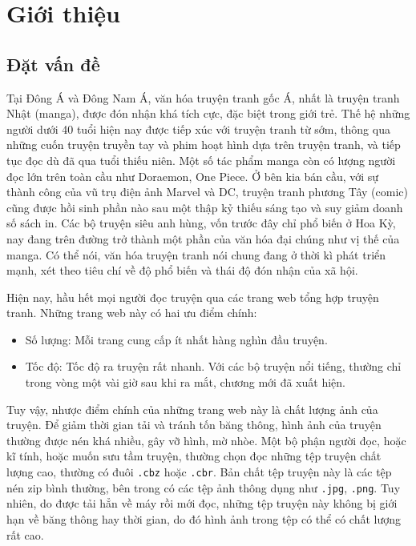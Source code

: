 \documentclass[../../thesis]{subfiles}
\begin{document}
\chapter{Giới thiệu}


\section{Đặt vấn đề}

Tại Đông Á và Đông Nam Á, văn hóa truyện tranh gốc Á, nhất là truyện tranh Nhật
(manga), được đón nhận khá tích cực, đặc biệt trong giới trẻ. Thế hệ những người
dưới 40 tuổi hiện nay được tiếp xúc với truyện tranh từ sớm, thông qua những
cuốn truyện truyền tay và phim hoạt hình dựa trên truyện tranh, và tiếp tục đọc
dù đã qua tuổi thiếu niên. Một số tác phẩm manga còn có lượng người đọc lớn trên
toàn cầu như Doraemon, One Piece. Ở bên kia bán cầu, với sự thành công của vũ
trụ điện ảnh Marvel và DC, truyện tranh phương Tây (comic) cũng được hồi sinh
phần nào sau một thập kỷ thiếu sáng tạo và suy giảm doanh số sách in. Các bộ
truyện siêu anh hùng, vốn trước đây chỉ phổ biến ở Hoa Kỳ, nay đang trên đường
trở thành một phần của văn hóa đại chúng như vị thế của manga. Có thể nói, văn
hóa truyện tranh nói chung đang ở thời kì phát triển mạnh, xét theo tiêu chí về
độ phổ biến và thái độ đón nhận của xã hội.

Hiện nay, hầu hết mọi người đọc truyện qua các trang web tổng hợp truyện tranh.
Những trang web này có hai ưu điểm chính:

\begin{itemize}
    \item
        Số lượng: Mỗi trang cung cấp ít nhất hàng nghìn đầu truyện.
    \item
        Tốc độ: Tốc độ ra truyện rất nhanh. Với các bộ truyện nổi tiếng, thường
        chỉ trong vòng một vài giờ sau khi ra mắt, chương mới đã xuất hiện.
\end{itemize}

Tuy vậy, nhược điểm chính của những trang web này là chất lượng ảnh của truyện.
Để giảm thời gian tải và tránh tốn băng thông, hình ảnh của truyện thường được
nén khá nhiều, gây vỡ hình, mờ nhòe. Một bộ phận người đọc, hoặc kĩ tính, hoặc
muốn sưu tầm truyện, thường chọn đọc những tệp truyện chất lượng cao, thường có
đuôi \texttt{.cbz} hoặc \texttt{.cbr}. Bản chất tệp truyện này là các tệp nén
zip bình thường, bên trong có các tệp ảnh thông dụng như \texttt{.jpg},
\texttt{.png}. Tuy nhiên, do được tải hẳn về máy rồi mới đọc, những tệp truyện
này không bị giới hạn về băng thông hay thời gian, do đó hình ảnh trong tệp có
thể có chất lượng rất cao.
\end{document}
